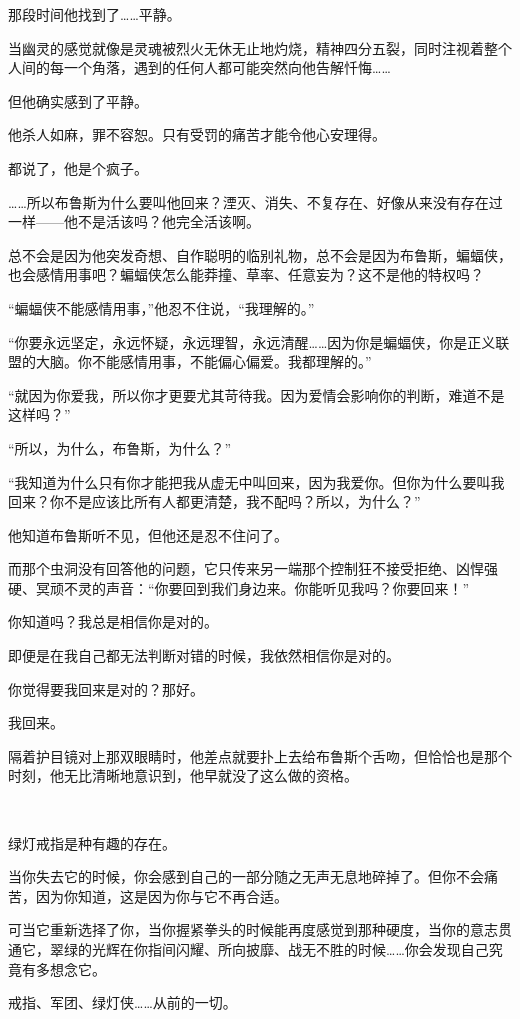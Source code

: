 \documentclass[../main]{subfiles}
\begin{document}
那段时间他找到了……平静。

当幽灵的感觉就像是灵魂被烈火无休无止地灼烧，精神四分五裂，同时注视着整个人间的每一个角落，遇到的任何人都可能突然向他告解忏悔……

但他确实感到了平静。

他杀人如麻，罪不容恕。只有受罚的痛苦才能令他心安理得。

都说了，他是个疯子。

……所以布鲁斯为什么要叫他回来？湮灭、消失、不复存在、好像从来没有存在过一样——他不是活该吗？他完全活该啊。

总不会是因为他突发奇想、自作聪明的临别礼物，总不会是因为布鲁斯，蝙蝠侠，也会感情用事吧？蝙蝠侠怎么能莽撞、草率、任意妄为？这不是他的特权吗？

“蝙蝠侠不能感情用事，”他忍不住说，“我理解的。”

“你要永远坚定，永远怀疑，永远理智，永远清醒……因为你是蝙蝠侠，你是正义联盟的大脑。你不能感情用事，不能偏心偏爱。我都理解的。”

“就因为你爱我，所以你才更要尤其苛待我。因为爱情会影响你的判断，难道不是这样吗？”

“所以，为什么，布鲁斯，为什么？”

“我知道为什么只有你才能把我从虚无中叫回来，因为我爱你。但你为什么要叫我回来？你不是应该比所有人都更清楚，我不配吗？所以，为什么？”

他知道布鲁斯听不见，但他还是忍不住问了。

而那个虫洞没有回答他的问题，它只传来另一端那个控制狂不接受拒绝、凶悍强硬、冥顽不灵的声音：“你要回到我们身边来。你能听见我吗？你要回来！”

你知道吗？我总是相信你是对的。

即便是在我自己都无法判断对错的时候，我依然相信你是对的。

你觉得要我回来是对的？那好。

我回来。

隔着护目镜对上那双眼睛时，他差点就要扑上去给布鲁斯个舌吻，但恰恰也是那个时刻，他无比清晰地意识到，他早就没了这么做的资格。

~\

绿灯戒指是种有趣的存在。

当你失去它的时候，你会感到自己的一部分随之无声无息地碎掉了。但你不会痛苦，因为你知道，这是因为你与它不再合适。

可当它重新选择了你，当你握紧拳头的时候能再度感觉到那种硬度，当你的意志贯通它，翠绿的光辉在你指间闪耀、所向披靡、战无不胜的时候……你会发现自己究竟有多想念它。

戒指、军团、绿灯侠……从前的一切。
\end{document}
